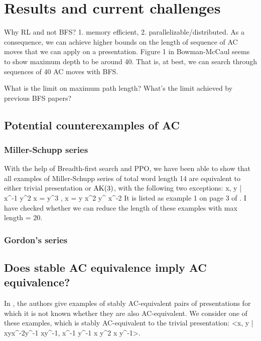 
\section{Results and current challenges}

Why RL and not BFS? 1. memory efficient, 2. parallelizable/distributed. As a consequence,  we can achieve higher bounds on the length of sequence of AC moves that we can apply on a presentation. Figure 1 in Bowman-McCaul seems to show maximum depth to be around 40. That is, at best, we can search through sequences of 40 AC moves with BFS.

What is the limit on maximum path length? What's the limit achieved by previous BFS papers?
\subsection{Potential counterexamples of AC}
\subsubsection{Miller-Schupp series}
With the help of Breadth-first search and PPO, we have been able to show that all examples of Miller-Schupp series of total word length 14 are equivalent to either trivial presentation or $\text{AK}(3)$, with the following two exceptions:
\bea
\langle x, y | x^{-1} y^2 x = y^{3} , x = y x^2 y^{} x^{-2}\rangle
\eea
It is listed as example 1 on page 3 of \cite{MMS}. I have checked whether we can reduce the length of these examples with max length = 20.


\subsubsection{Gordon's series}


\subsection{Does stable AC equivalence imply AC equivalence?}

In \cite{MMS}, the authors give examples of stably AC-equivalent pairs of presentations for which it is not known whether they are also AC-equivalent. We consider one of these examples, which is stably AC-equivalent to the trivial presentation:
\bea
<x, y | xyx^{-2}y^{-1} xy^{-1}, x^{-1} y^{-1} x y^2 x y^{-1}>.
\eea

